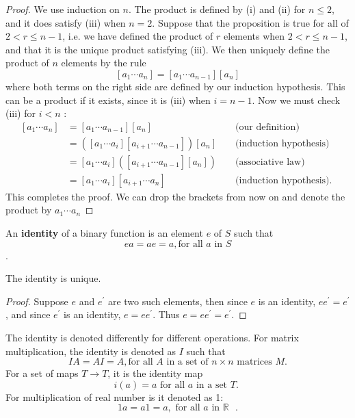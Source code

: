 \documentclass[main.tex]{subfiles}
\begin{document}
\begin{proof}
We use induction on $n$. The product is defined by (i) and (ii) for $n \leq 2$, and it does satisfy (iii) when $n=2$. Suppose that the proposition is true for all of $2 < r \leq n - 1$, i.e. we have defined the product of $r$ elements when $2 < r \leq n-1$, and that it is the unique product satisfying (iii). We then uniquely define the product of $n$ elements by the rule
$$
\left[a_1 \cdots a_n\right]=\left[a_1 \cdots a_{n-1}\right]\left[a_n\right]
$$
where both terms on the right side are defined by our induction hypothesis. This can be a product if it exists, since it is (iii) when $i=n-1$. Now we must check (iii) for $i<n$ :
$$
\begin{array}{rlrl}
{\left[a_1 \cdots a_n\right]} & =\left[a_1 \cdots a_{n-1}\right]\left[a_n\right] & & \text { (our definition) } \\
& =\left(\left[a_1 \cdots a_i\right]\left[a_{i+1} \cdots a_{n-1}\right]\right)\left[a_n\right] & & \text { (induction hypothesis) } \\
& =\left[a_1 \cdots a_i\right]\left(\left[a_{i+1} \cdots a_{n-1}\right]\left[a_n\right]\right) & & \text { (associative law) } \\
& =\left[a_1 \cdots a_i\right]\left[a_{i+1} \cdots a_n\right] & & \text { (induction hypothesis). }
\end{array}
$$
This completes the proof. We can drop the brackets from now on and denote the product by $a_1 \cdots a_n$
\end{proof}

\begin{definition}
    An \textbf{identity} of a binary function is an element $e$ of $S$ such that
    $$ ea = ae = a, \text{for all } a \text{ in } S $$.
\end{definition}
The identity is unique. 
\begin{proof}
Suppose $e$ and $e^{\prime}$ are two such elements, then since $e$ is an identity, $e e^{\prime}=e^{\prime}$, and since $e^{\prime}$ is an identity, $e=e e^{\prime}$. Thus $e=e e^{\prime}=e^{\prime}$.
\end{proof}
The identity is denoted differently for different operations. For matrix multiplication, the identity is denoted as $I$ such that $$ IA = AI = A, \text{for all } A \text{ in a set of $n\times n$ matrices } M. $$ For a set of maps $T \rightarrow T$, it is the identity map $$i(a) = a \text{ for all $a$ in a set $T$. }$$ For multiplication of real number is it denoted as 1: $$1a = a1 = a, \text{ for all $a$ in $\mathbb{R}$ }.$$
\end{document}
